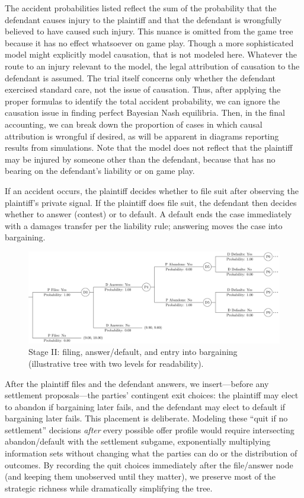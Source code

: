 \documentclass{article}
\begin{document}
The accident probabilities listed reflect the sum of the probability that the defendant causes injury to the plaintiff and that the defendant is wrongfully believed to have caused such injury. This nuance is omitted from the game tree because it has no effect whatsoever on game play. Though a more sophisticated model might explicitly model causation, that is not modeled here. Whatever the route to an injury relevant to the model, the legal attribution of causation to the defendant is assumed. The trial itself concerns only whether the defendant exercised standard care, not the issue of causation. Thus, after applying the proper formulas to identify the total accident probability, we can ignore the causation issue in finding perfect Bayesian Nash equilibria. Then, in the final accounting, we can break down the proportion of cases in which causal attribution is wrongful if desired, as will be apparent in diagrams reporting results from simulations. Note that the model does not reflect that the plaintiff may be injured by someone other than the defendant, because that has no bearing on the defendant's liability or on game play.

If an accident occurs, the plaintiff decides whether to file suit after observing the plaintiff's private signal. If the plaintiff does file suit, the defendant then decides whether to answer (contest) or to default. A default ends the case immediately with a damages transfer per the liability rule; answering moves the case into bargaining.

  \begin{figure}[t]
    \centering
    \includegraphics[width=\textwidth]{../Figures/smalltree_mid.pdf}
    \caption{Stage II: filing, answer/default, and entry into bargaining (illustrative tree with two levels for readability).}
    \label{fig:smalltree_mid.pdf}
  \end{figure}

After the plaintiff files and the defendant answers, we insert—before any settlement proposals—the parties’ contingent exit choices: the plaintiff may elect to abandon if bargaining later fails, and the defendant may elect to default if bargaining later fails. This placement is deliberate. Modeling these “quit if no settlement” decisions \emph{after} every possible offer profile would require intersecting abandon/default with the settlement subgame, exponentially multiplying information sets without changing what the parties can do or the distribution of outcomes. By recording the quit choices immediately after the file/answer node (and keeping them unobserved until they matter), we preserve most of the strategic richness while dramatically simplifying the tree.
\end{document}

